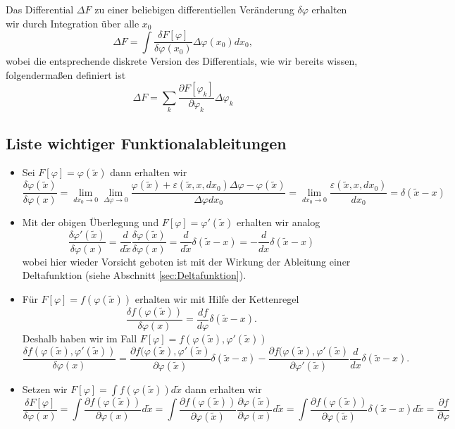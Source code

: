 %
Das Differential $\Delta F$ zu einer beliebigen differentiellen Veränderung
$\delta\varphi$ erhalten wir durch Integration über alle $x_0$
\begin{equation}\label{eq:DifferentialVariation}
  \Delta F = \int\frac{\delta F[\varphi]}{\delta\varphi(x_0)}\Delta\varphi(x_0)dx_0,
\end{equation}
wobei die entsprechende diskrete Version des Differentials, wie wir bereits
wissen, folgendermaßen definiert ist
\begin{equation}\label{eq:DifferentialMultiD}
    \Delta F = \sum\limits_k \frac{\partial F[\varphi_k]}{\partial\varphi_k}\Delta\varphi_k
\end{equation}
%
\subsection{Liste wichtiger Funktionalableitungen}\label{sec:WichtigeAbleitungen}
\begin{itemize}
  \item Sei $F[\varphi]=\varphi(\tilde{x})$ dann erhalten wir
    \[
      \frac{\delta\varphi(\tilde{x})}{\delta\varphi(x)}=\lim_{dx_0\rightarrow 0}\lim_{\Delta\varphi\rightarrow 0}
      \frac{\varphi(\tilde{x})+\varepsilon(\tilde{x},x,dx_0)\Delta\varphi-\varphi(\tilde{x})}{\Delta\varphi dx_0}=\lim_{dx_0\rightarrow 0}\frac{\varepsilon(\tilde{x},x,dx_0)}{dx_0}=\delta(\tilde{x}-x)
    \]
  \item Mit der obigen Überlegung und $F[\varphi]=\varphi'(\tilde{x})$ erhalten wir analog
    \[
      \frac{\delta\varphi'(\tilde{x})}{\delta\varphi(x)}=\frac{d}{d\tilde{x}} \frac{\delta\varphi(\tilde{x})}{\delta\varphi(x)}=\frac{d}{d\tilde{x}}\delta(\tilde{x}-x)=-\frac{d}{dx}\delta(\tilde{x}-x)
    \]
    wobei hier wieder Vorsicht geboten ist mit der Wirkung der Ableitung einer
    Deltafunktion (siehe Abschnitt \ref{sec:Deltafunktion}).
  \item Für $F[\varphi]=f(\varphi(\tilde{x}))$ erhalten wir mit Hilfe der Kettenregel
    \[
      \frac{\delta f(\varphi(\tilde{x}))}{\delta\varphi(x)}=\frac{df}{d\varphi}\delta(\tilde{x}-x).
    \]
    Deshalb haben wir im Fall  $F[\varphi]=f(\varphi(\tilde{x}),\varphi'(\tilde{x}))$
      \[
	\frac{\delta f(\varphi(\tilde{x}),\varphi'(\tilde{x}))}{\delta\varphi(x)}=
	\frac{\partial f(\varphi(\tilde{x}),\varphi'(\tilde{x})}{\partial\varphi(\tilde{x})}\delta(\tilde{x}-x)-
	  \frac{\partial f(\varphi(\tilde{x}),\varphi'(\tilde{x})}{\partial\varphi'(\tilde{x})}\frac{d}{dx}\delta(\tilde{x}-x).
    \]
  \item Setzen wir $F[\varphi]=\int f(\varphi(\tilde{x}))d\tilde{x}$ dann erhalten  wir 
    \[
      \frac{\delta F[\varphi]}{\delta\varphi(x)}=\int \frac{\partial f(\varphi(\tilde{x}))}{\partial\varphi(x)}d\tilde{x}=
      \int\frac{\partial f(\varphi(\tilde{x}))}{\partial\varphi(\tilde{x})}\frac{\partial\varphi(\tilde{x})}{\partial\varphi(x)}d\tilde{x}=
      \int\frac{\partial f(\varphi(\tilde{x}))}{\partial\varphi(\tilde{x})}\delta(\tilde{x}-x)d\tilde{x}=\frac{\partial f}{\partial\varphi}
    \]
\end{itemize}

